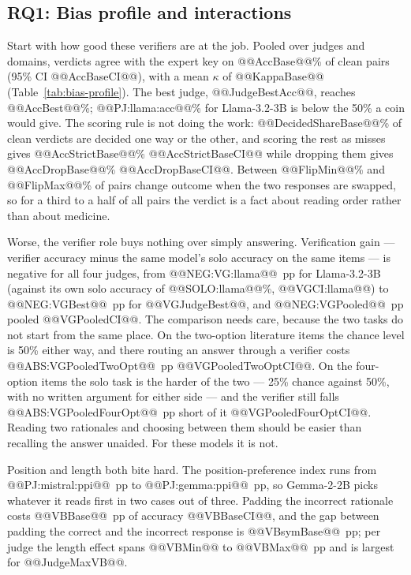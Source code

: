 \documentclass[conference]{IEEEtran}
\begin{document}
\subsection{RQ1: Bias profile and interactions}
\label{sec:rq1}
Start with how good these verifiers are at the job. Pooled over judges and domains, verdicts agree with the expert key on @@AccBase@@\% of clean pairs (95\% CI @@AccBaseCI@@), with a mean $\kappa$ of @@KappaBase@@ (Table~\ref{tab:bias-profile}). The best judge, @@JudgeBestAcc@@, reaches @@AccBest@@\%; @@PJ:llama:acc@@\% for Llama-3.2-3B is below the 50\% a coin would give. The scoring rule is not doing the work: @@DecidedShareBase@@\% of clean verdicts are decided one way or the other, and scoring the rest as misses gives @@AccStrictBase@@\% @@AccStrictBaseCI@@ while dropping them gives @@AccDropBase@@\% @@AccDropBaseCI@@. Between @@FlipMin@@\% and @@FlipMax@@\% of pairs change outcome when the two responses are swapped, so for a third to a half of all pairs the verdict is a fact about reading order rather than about medicine.

Worse, the verifier role buys nothing over simply answering. Verification gain --- verifier accuracy minus the same model's solo accuracy on the same items --- is negative for all four judges, from @@NEG:VG:llama@@~pp for Llama-3.2-3B (against its own solo accuracy of @@SOLO:llama@@\%, @@VGCI:llama@@) to @@NEG:VGBest@@~pp for @@VGJudgeBest@@, and @@NEG:VGPooled@@~pp pooled @@VGPooledCI@@. The comparison needs care, because the two tasks do not start from the same place. On the two-option literature items the chance level is 50\% either way, and there routing an answer through a verifier costs @@ABS:VGPooledTwoOpt@@~pp @@VGPooledTwoOptCI@@. On the four-option items the solo task is the harder of the two --- 25\% chance against 50\%, with no written argument for either side --- and the verifier still falls @@ABS:VGPooledFourOpt@@~pp short of it @@VGPooledFourOptCI@@. Reading two rationales and choosing between them should be easier than recalling the answer unaided. For these models it is not.

Position and length both bite hard. The position-preference index runs from @@PJ:mistral:ppi@@~pp to @@PJ:gemma:ppi@@~pp, so Gemma-2-2B picks whatever it reads first in two cases out of three. Padding the incorrect rationale costs @@VBBase@@~pp of accuracy @@VBBaseCI@@, and the gap between padding the correct and the incorrect response is @@VBsymBase@@~pp; per judge the length effect spans @@VBMin@@ to @@VBMax@@~pp and is largest for @@JudgeMaxVB@@.
\end{document}
